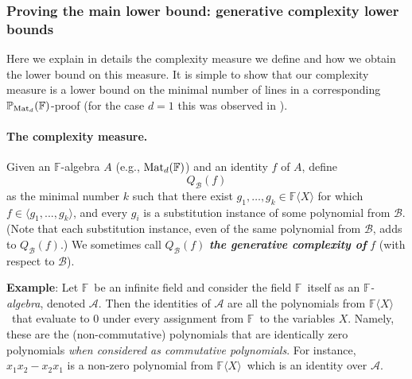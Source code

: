 \documentclass[12pt,reqno]{article}
\newcommand\F{\ensuremath{\mathbb F}}
\newcommand\PP{{\mathbb P}}
\newcommand\PMd{\ensuremath{\PP_{{\rm Mat}_d}(\F)}}
\newcommand {\ind} {\noindent}
\newcommand {\para}[1] {\paragraph{#1}}
\newcommand{\matd}{{\ensuremath{{\rm Mat}_d(\F)}}}
\newcommand{\freea}{\ensuremath{\F\langle X\rangle}}
\newcommand{\iddofix}[2][]
{\todo[inline, size=\footnotesize, caption={#2}, #1, linecolor=green!70!white,         backgroundcolor=red!30!white,bordercolor=white]
{{#2}}}
\begin{document}



\subsubsection{Proving the main lower bound: generative complexity lower bounds}\label{sec:ovrv:proof_of_main_lower_bound}
Here we explain in details the complexity measure we define and how we obtain the lower bound on this measure. It is simple to show that our complexity measure is a lower bound on the minimal number of lines in a corresponding \PMd-proof (for the case $d=1$ this was observed in \cite{Hru11}).
\para{The complexity measure.}




Given an \F-algebra $A$ (e.g., \matd) and an identity $f$ of $A$, define
$$Q_{\mathcal B}(f)$$  as the minimal number $k$ such that there exist $g_1,\ldots,g_k\in \freea$ for which  $f\in \langle g_1,...,g_k \rangle$, and every $g_i$ is a substitution instance of some polynomial  from $\mathcal B$. (Note that each substitution instance, even of the same polynomial from $\mathcal B $, adds to $Q_{\mathcal B}(f)$.) We sometimes call $Q_{\mathcal B}(f)$ \textit{\textbf{the generative complexity of}} $f$ (with respect to $\mathcal B$).
\bigskip

\ind \textbf{Example}: Let \F\ be an infinite field and consider the field \F\ itself as an \textit{\F-algebra}, denoted $\mathscr A$.
Then the identities of $\mathscr A$ are all the polynomials from \freea\ that evaluate to $0$ under every  assignment from \F\ to the variables \(X\). Namely, these are the (non-commutative) polynomials that are identically zero polynomials \emph{when considered as commutative polynomials}. For instance, $x_1x_2-x_2 x_1$ is a non-zero polynomial from \freea\ which is an identity over $\mathscr A$.
\end{document}
